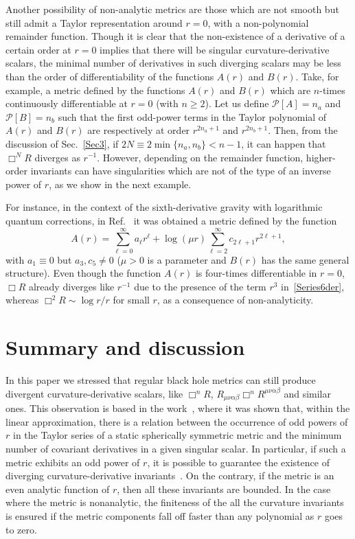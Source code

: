 \documentclass[aps,prd,a4paper,twocolumn,showpacs,showkeys,preprintnumbers,amsmath,amssymb,nofootinbib,usenames,dvipsnames]{revtex4-2}
\newcommand{\be}{\begin{eqnarray}}
\def\beq{\begin{equation}}
\def\eeq{\end{equation}}
\def\al{\alpha}
\def\be{\beta}
\begin{document}
Another possibility of non-analytic metrics are those which are not smooth but still admit a Taylor representation around $r=0$, with a non-polynomial remainder function. Though it is clear that the non-existence of a derivative of a certain order at $r=0$ implies that there will be singular curvature-derivative scalars, the minimal number of derivatives in such diverging scalars may be less than the order of differentiability of the functions $A(r)$ and $B(r)$. Take, for example, a metric defined by the functions $A(r)$ and $B(r)$ which are $n$-times continuously differentiable at $r=0$ (with $n \geqslant 2$).
Let us define $\mathcal{P}[A]= n_a$ and $\mathcal{P}[B]= n_b$ such that the first odd-power terms in the Taylor polynomial of $A(r)$ and $B(r)$ are respectively at order $r^{2n_a+1}$ and $r^{2n_b+1}$. Then, from the discussion of Sec.~\ref{Sec3}, if $2N \equiv 2\min\lbrace n_a,n_b\rbrace<n-1$, it can happen that
$\Box^{N} R$ diverges as $r^{-1}$. However, depending on the remainder function, higher-order invariants can have singularities which are not of the type of an inverse power of $r$, as we show in the next example.

For instance, in the context of the sixth-derivative gravity  with logarithmic quantum corrections, in Ref.~\cite{Nos6der} it was obtained a metric defined by the function
%
\beq \label{Series6der}
A(r) = \sum_{\ell=0}^\infty a_{\ell} r^{\ell} + \log(\mu r) \sum_{\ell=2}^\infty c_{2\ell+1} r^{2\ell+1},
\eeq
with $a_1 \equiv 0$ but $a_3, c_5 \neq 0$ ($\mu>0$ is a parameter and $B(r)$ has the same general structure).
Even though the function $A(r)$ is four-times differentiable in $r=0$, $\Box R$ already diverges like $r^{-1}$ due to the presence of the term $r^3$ in~\eqref{Series6der}, whereas $\Box^2 R \sim \log r / r$ for small $r$, as a consequence of  non-analyticity.




\section{Summary and discussion}
\label{Sec6}

In this paper we stressed that regular black hole metrics can still produce divergent curvature-derivative scalars, like $\Box^n R$,  $R_{\mu\nu\al\be} \Box^n R^{\mu\nu\al\be}$ and similar ones. This observation is based in the work~\cite{Nos6der}, where it was shown that, within the linear approximation, there is a relation between the occurrence of odd powers of $r$ in the Taylor series of a static spherically symmetric metric and the minimum  number of covariant derivatives in a given singular scalar. In particular, if such a metric exhibits an odd power of $r$, it is possible to guarantee the existence of diverging curvature-derivative invariants~\cite{Nos6der}. On the contrary, if the metric is an even analytic function of $r$, then all these invariants are bounded. In the case where the metric is nonanalytic, the finiteness of the all the curvature invariants is ensured if the metric components fall off faster than any polynomial as $r$ goes to zero.
\end{document}
